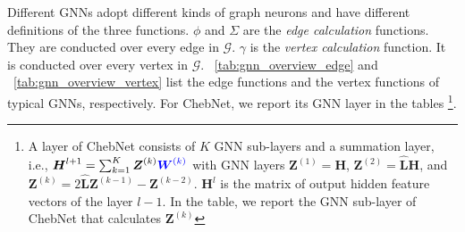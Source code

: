 Different GNNs adopt different kinds of graph neurons and have different definitions of the three functions.
$\phi$ and $\Sigma$ are the \emph{edge calculation} functions.
They are conducted over every edge in $\mathcal{G}$.
$\gamma$ is the \emph{vertex calculation} function.
It is conducted over every vertex in $\mathcal{G}$.
\tablename~\ref{tab:gnn_overview_edge} and \tablename~\ref{tab:gnn_overview_vertex} list the edge functions and the vertex functions of typical GNNs, respectively.
For ChebNet, we report its GNN layer in the tables \footnote{A layer of ChebNet consists of $K$ GNN sub-layers and a summation layer, i.e., $\boldsymbol{H}^{l+1} = \sum_{k=1}^K{\boldsymbol{Z}^{(k)} \textcolor{blue}{\boldsymbol{W}^{(k)}}}$ with GNN layers $\boldsymbol{Z}^{(1)}=\boldsymbol{H}$, $\boldsymbol{Z}^{(2)}=\hat{\boldsymbol{L}}\boldsymbol{H}$, and $\boldsymbol{Z}^{(k)}=2\hat{\boldsymbol{L}}\boldsymbol{Z}^{(k-1)} - \boldsymbol{Z}^{(k-2)}$. $\boldsymbol{H}^l$ is the matrix of output hidden feature vectors of the layer $l-1$. In the table, we report the GNN sub-layer of ChebNet that calculates $\boldsymbol{Z}^{(k)}$}.

